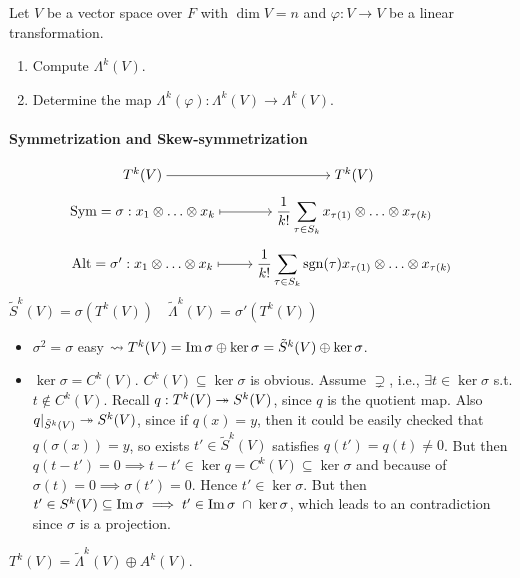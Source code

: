 \begin{exercise}
  Let $V$ be a vector space over $F$ with $\dim V = n$ and $\varphi: V\to V$
  be a linear transformation.
  \begin{enumerate}[(1)]
    \item Compute $\Lambda^k(V)$.
    \item Determine the map $\Lambda^k(\varphi): \Lambda^k(V)\to \Lambda^k(V)$.
  \end{enumerate}
\end{exercise}

\paragraph{Symmetrization and Skew-symmetrization}
\[
  \begin{tikzcd}[cramped, row sep=tiny]
    T^k(V) \arrow[r] & T^k(V) \\
    \Sym = \sigma: x_1\Ot \dots \Ot x_k \arrow[r, mapsto]
    & \displaystyle \frac{1}{k!}\sum_{\tau \in S_k}
    x_{\tau(1)}\Ot \dots \Ot x_{\tau(k)} \\
    \Alt = \sigma': x_1\Ot \dots \Ot x_k \arrow[r, mapsto]
    & \displaystyle \frac{1}{k!}\sum_{\tau \in S_k} \sgn(\tau)
    x_{\tau(1)}\Ot \dots \Ot x_{\tau(k)}
  \end{tikzcd}
\]
$\tilde{S}^k(V) = \sigma(T^k(V)) \quad \tilde{\Lambda}^k(V) = \sigma'(T^k(V))$

\begin{itemize}
  \item $\sigma^2 = \sigma$ easy $\leadsto T^k(V) = \operatorname{Im} \sigma \oplus
    \ker \sigma = \tilde{S}^k(V) \oplus \ker \sigma$.
  \item $\ker \sigma = C^k(V)$.
    $C^k(V) \subseteq \ker \sigma$ is obvious.
    Assume $\supsetneq$, i.e., $\exists t \in \ker \sigma$ s.t.
    $t \not\in C^k(V)$.
    Recall $q: T^k(V) \twoheadrightarrow S^k(V)$, since $q$ is the quotient map. Also
    $q |_{\tilde{S}^k(V)} \twoheadrightarrow S^k(V)$, since if $q(x) = y$, then it could
    be easily checked that $q(\sigma(x)) = y$, so exists $t' \in \tilde{S}^k(V)$ satisfies
    $q(t') = q(t) \neq 0$. But then $q(t-t') = 0 \implies t-t' \in \ker q = C^k(V) \subseteq
    \ker \sigma$ and because of $\sigma(t) = 0 \implies \sigma(t') = 0$. Hence $t' \in \ker \sigma$.
    But then $t' \in S^k(V) \subseteq \operatorname{Im} \sigma \implies t' \in \operatorname{Im} \sigma \;\cap\;\ker \sigma$,
    which leads to an contradiction since $\sigma$ is a projection.
\end{itemize}

\begin{exercise}
  $T^k(V) = \tilde{\Lambda}^k(V) \oplus A^k(V)$.
\end{exercise}
